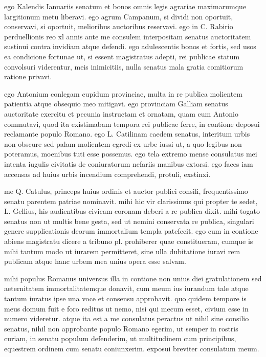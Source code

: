  ego Kalendis Ianuariis senatum et bonos omnis legis agrariae maximarumque largitionum metu liberavi. ego agrum Campanum, si dividi non oportuit, conservavi, si oportuit, melioribus auctoribus reservavi. ego in C. Rabirio perduellionis reo xl annis ante me consulem interpositam senatus auctoritatem sustinui contra invidiam atque defendi. ego adulescentis bonos et fortis, sed usos ea condicione fortunae ut, si essent magistratus adepti, rei publicae statum convolsuri viderentur, meis inimicitiis, nulla senatus mala gratia comitiorum ratione privavi.

 ego Antonium conlegam cupidum provinciae, multa in re publica molientem patientia atque obsequio meo mitigavi. ego provinciam Galliam senatus auctoritate exercitu et pecunia instructam et ornatam, quam cum Antonio commutavi, quod ita existimabam tempora rei publicae ferre, in contione deposui reclamante populo Romano. ego L. Catilinam caedem senatus, interitum urbis non obscure sed palam molientem egredi ex urbe iussi ut, a quo legibus non poteramus, moenibus tuti esse possemus. ego tela extremo mense consulatus mei intenta iugulis civitatis de coniuratorum nefariis manibus extorsi. ego faces iam accensas ad huius urbis incendium comprehendi, protuli, exstinxi.

 me Q. Catulus, princeps huius ordinis et auctor publici consili, frequentissimo senatu parentem patriae nominavit. mihi hic vir clarissimus qui propter te sedet, L. Gellius, his audientibus civicam coronam deberi a re publica dixit. mihi togato senatus non ut multis bene gesta, sed ut nemini conservata re publica, singulari genere supplicationis deorum immortalium templa patefecit. ego cum in contione abiens magistratu dicere a tribuno pl. prohiberer quae constitueram, cumque is mihi tantum modo ut iurarem permitteret, sine ulla dubitatione iuravi rem publicam atque hanc urbem mea unius opera esse salvam.

 mihi populus Romanus universus illa in contione non unius diei gratulationem sed aeternitatem immortalitatemque donavit, cum meum ius iurandum tale atque tantum iuratus ipse una voce et consensu approbavit. quo quidem tempore is meus domum fuit e foro reditus ut nemo, nisi qui mecum esset, civium esse in numero videretur. atque ita est a me consulatus peractus ut nihil sine consilio senatus, nihil non approbante populo Romano egerim, ut semper in rostris curiam, in senatu populum defenderim, ut multitudinem cum principibus, equestrem ordinem cum senatu coniunxerim. exposui breviter consulatum meum.

